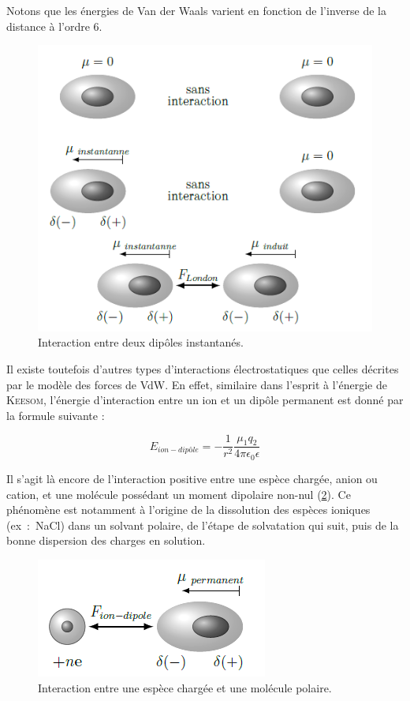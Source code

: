 {{Notons que les énergies de Van der Waals varient en fonction de l'inverse de la distance à l'ordre 6.

\begin{figure}[h]
\centering
\includegraphics[scale=0.8]{image/London}
\caption{Interaction entre deux dipôles instantanés.}
\label{figLondon}
\end{figure}


Il existe toutefois d'autres types d'interactions électrostatiques que celles décrites par le modèle des forces de VdW. En effet, similaire dans l'esprit à l'énergie de \textsc{Keesom}, l'énergie d'interaction entre un ion et un dipôle permanent est donné par la formule suivante :

\begin{equation}
E_{ion-dipôle} = - \frac{1}{r^{2}} \frac{\mu_{1}q_{2}}{4\pi \epsilon_{0} \epsilon}
\end{equation} 

Il s'agit là encore de l'interaction positive entre une espèce chargée, anion ou cation, et une molécule possédant un moment dipolaire non-nul (\ref{figiondipole}). Ce phénomène est notamment à l'origine de la dissolution des espèces ioniques (ex~:~NaCl) dans un solvant polaire, de l'étape de solvatation qui suit, puis de la bonne dispersion des charges en solution.

\begin{figure}[h]
\centering
\includegraphics[scale=0.7]{image/Ion-dipole}
\caption{Interaction entre une espèce chargée et une molécule polaire.}
\label{figiondipole}
\end{figure}

}}
